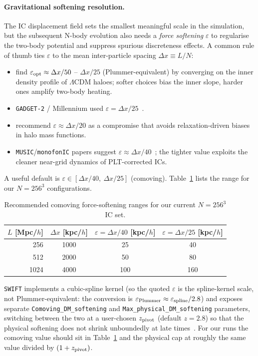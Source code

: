 \documentclass[12pt]{article}
\begin{document}
\paragraph{Gravitational softening resolution.}
The IC displacement field sets the smallest meaningful scale in the
simulation, but the subsequent N-body evolution also needs a
\emph{force softening} $\varepsilon$ to regularise the two-body
potential and suppress spurious discreteness effects.  A common rule
of thumb ties $\varepsilon$ to the mean inter-particle spacing
$\Delta x \equiv L/N$:
%
\begin{itemize}
  \item \citet{Power2003} find $\varepsilon_{\rm opt} \approx \Delta x/50$
        -- $\Delta x/25$ (Plummer-equivalent) by converging on the
        inner density profile of $\Lambda$CDM haloes; softer choices
        bias the inner slope, harder ones amplify two-body heating.
  \item \texttt{GADGET-2} / Millennium used
        $\varepsilon = \Delta x/25$~\citep{Springel2005}.
  \item \citet{Ludlow2019} recommend $\varepsilon \approx \Delta x/20$
        as a compromise that avoids relaxation-driven biases in halo
        mass functions.
  \item \texttt{MUSIC}/\texttt{monofonIC} papers suggest
        $\varepsilon \approx \Delta x/40$~\citep{Hahn2011, Michaux2020};
        the tighter value exploits the cleaner near-grid dynamics of
        PLT-corrected ICs.
\end{itemize}
%
A useful default is $\varepsilon \in [\Delta x/40,\ \Delta x/25]$
(comoving).  Table~\ref{tab:softening} lists the range for our
$N=256^3$ configurations.
%
\begin{table}[h]
\centering
\begin{tabular}{rccc}
\hline
$L$ [Mpc/$h$] & $\Delta x$ [kpc/$h$] & $\varepsilon=\Delta x/40$ [kpc/$h$]
              & $\varepsilon=\Delta x/25$ [kpc/$h$] \\ \hline
 256 &  1000 & 25 & 40 \\
 512 &  2000 & 50 & 80 \\
1024 &  4000 & 100 & 160 \\ \hline
\end{tabular}
\caption{Recommended comoving force-softening ranges for our current
$N=256^3$ IC set.}
\label{tab:softening}
\end{table}
%
\texttt{SWIFT} implements a cubic-spline kernel (so the quoted
$\varepsilon$ is the spline-kernel scale, not Plummer-equivalent: the
conversion is $\varepsilon_{\rm Plummer} \approx \varepsilon_{\rm
spline}/2.8$) and exposes separate
\texttt{Comoving\_DM\_softening} and
\texttt{Max\_physical\_DM\_softening} parameters, switching between
the two at a user-chosen $z_{\rm pivot}$ (default $z=2.8$) so that the
physical softening does not shrink unboundedly at late
times~\citep{Schaller2024}.  For our runs the comoving value should
sit in Table~\ref{tab:softening} and the physical cap at roughly the
same value divided by $(1+z_{\rm pivot})$.
\end{document}
